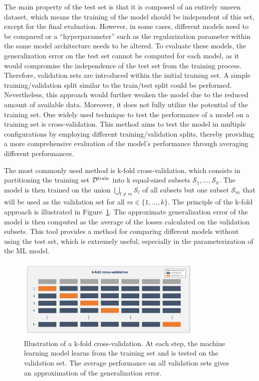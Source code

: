 \documentclass[main]{subfiles}
\begin{document}
The main property of the test set is that it is composed of an entirely unseen dataset, which means the training of the model should be independent of this set, except for the final evaluation. However, in some cases, different models need to be compared or a ``hyperparameter'' such as the regularization parameter within the same model architecture needs to be altered. To evaluate these models, the generalization error on the test set cannot be computed for each model, as it would compromise the independence of the test set from the training process. Therefore, validation sets are introduced within the initial training set. A simple training/validation split similar to the train/test split could be performed. Nevertheless, this approach would further weaken the model due to the reduced amount of available data. Moreover, it does not fully utilize the potential of the training set. One widely used technique to test the performance of a model on a training set is cross-validation. This method aims to test the model in multiple configurations by employing different training/validation splits, thereby providing a more comprehensive evaluation of the model's performance through averaging different performances. 

The most commonly used method is k-fold cross-validation, which consists in partitioning the training set $\mathcal{D}^{\text{train}}$ into k equal-sized subsets $\mathcal{S}_1,...,\mathcal{S}_k$. The model is then trained on the union $\bigcup_{l\neq m} \mathcal{S}_l$ of all subsets but one subset $\mathcal{S}_m$ that will be used as the validation set for all $m\in \{1,\ldots,k\}$. The principle of the k-fold approach is illustrated in Figure~\ref{fgr:kfold}. The approximate generalization error of the model is then computed as the average of the losses calculated on the validation subsets. This tool provides a method for comparing different models without using the test set, which is extremely useful, especially in the parameterization of the ML model.

\begin{figure}[ht]
  \centering
    \includegraphics[width=0.8\textwidth]{figures/4-ml/cross-validation.pdf}
    \caption{Illustration of a k-fold cross-validation. At each step, the machine learning model learns from the training set and is tested on the validation set. The average performance on all validation sets gives an approximation of the generalization error.}\label{fgr:kfold}
\end{figure}
\end{document}
